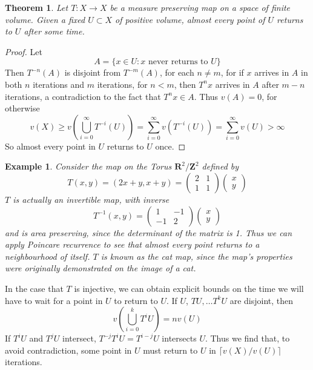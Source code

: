 \documentclass{article}
\theoremstyle{plain}
\newtheorem{theorem}{Theorem}
\newtheorem*{example}{Example}
\theoremstyle{definition}
\begin{document}
\begin{theorem}
    Let $T: X \to X$ be a measure preserving map on a space of finite volume. Given a fixed $U \subset X$ of positive volume, almost every point of $U$ returns to $U$ after some time.
\end{theorem}
\begin{proof}
    Let
    \[ A = \{ x \in U : \text{$x$ never returns to $U$} \} \]
    Then $T^{-n}(A)$ is disjoint from $T^{-m}(A)$, for each $n \neq m$, for if $x$ arrives in $A$ in both $n$ iterations and $m$ iterations, for $n < m$, then $T^n x$ arrives in $A$ after $m - n$ iterations, a contradiction to the fact that $T^n x \in A$. Thus $v(A) = 0$, for otherwise
    \[ v(X) \geq v\left( \bigcup_{i = 0}^\infty T^{-i}(U) \right) = \sum_{i = 0}^\infty v(T^{-i}(U)) = \sum_{i = 0}^\infty v(U) > \infty \]
    So almost every point in $U$ returns to $U$ once.
\end{proof}

\begin{example}
    Consider the map on the Torus $\mathbf{R}^2 / \mathbf{Z}^2$ defined by
    \[ T(x,y) = (2x + y, x + y) = \begin{pmatrix} 2 & 1 \\ 1 & 1 \end{pmatrix} \begin{pmatrix} x \\ y \end{pmatrix} \]
    $T$ is actually an invertible map, with inverse
    \[ T^{-1}(x,y) = \begin{pmatrix} 1 & -1 \\ -1 & 2 \end{pmatrix} \begin{pmatrix} x \\ y \end{pmatrix} \]
    and is area preserving, since the determinant of the matrix is 1. Thus we can apply Poincare recurrence to see that almost every point returns to a neighbourhood of itself. $T$ is known as the cat map, since the map's properties were originally demonstrated on the image of a cat.
\end{example}

In the case that $T$ is injective, we can obtain explicit bounds on the time we will have to wait for a point in $U$ to return to $U$. If $U$, $T U, \dots T^k U$ are disjoint, then
%
\[ v(\bigcup_{i = 0}^k T^i U) = n v(U) \]
%
If $T^iU$ and $T^jU$ intersect, $T^{-j}T^iU = T^{i-j}U$ intersects $U$. Thus we find that, to avoid contradiction, some point in $U$ must return to $U$ in $\lceil v(X)/v(U) \rceil$ iterations.
\end{document}
